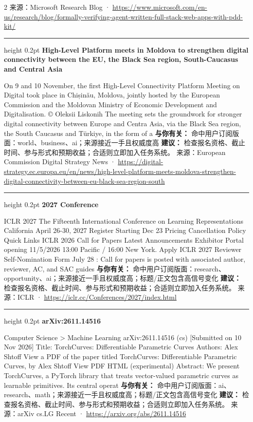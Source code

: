 \documentclass[10.5pt]{ctexart}
\begin{document}
\begin{multicols}{2}
{\footnotesize\color{ormuted} 来源：Microsoft Research Blog · \url{https://www.microsoft.com/en-us/research/blog/formally-verifying-agent-written-full-stack-web-apps-with-pdd-kit/}}
\vspace{2mm}
\hrule height 0.2pt
\vspace{2mm}
{\large\bfseries High-Level Platform meets in Moldova to strengthen digital connectivity between the EU, the Black Sea region, South-Caucasus and Central Asia}\par
On 9 and 10 November, the first High-Level Connectivity Platform Meeting on Digital took place in Chișinău, Moldova, jointly hosted by the European Commission and the Moldovan Ministry of Economic Development and Digitalisation. © Oleksii Liskonih The meeting sets the groundwork for stronger digital connectivity between Europe and Centra Asia, via the Black Sea region, the South Caucasus and Türkiye, in the form of a
\textbf{与你有关：} 命中用户订阅版面：world、business、ai；来源接近一手且权威度高
\textbf{建议：} 检查报名资格、截止时间、参与形式和预期收益；合适则立即加入任务系统。
{\footnotesize\color{ormuted} 来源：European Commission Digital Strategy News · \url{https://digital-strategy.ec.europa.eu/en/news/high-level-platform-meets-moldova-strengthen-digital-connectivity-between-eu-black-sea-region-south}}
\vspace{2mm}
\hrule height 0.2pt
\vspace{2mm}
{\large\bfseries 2027 Conference}\par
ICLR 2027 The Fifteenth International Conference on Learning Representations California April 26-30, 2027 Register Starting Dec 23 Pricing Cancellation Policy Quick Links ICLR 2026 Call for Papers Latest Announcements Exhibitor Portal opening 11/5/2026 13:00 Pacific / 16:00 New York. Apply ICLR 2027 Reviewer Self-Nomination Form July 28 : Call for papers is posted with associated author, reviewer, AC, and SAC guides 
\textbf{与你有关：} 命中用户订阅版面：research、opportunity、ai；来源接近一手且权威度高；标题/正文包含高信号变化
\textbf{建议：} 检查报名资格、截止时间、参与形式和预期收益；合适则立即加入任务系统。
{\footnotesize\color{ormuted} 来源：ICLR · \url{https://iclr.cc/Conferences/2027/index.html}}
\vspace{2mm}
\hrule height 0.2pt
\vspace{2mm}
{\large\bfseries arXiv:2611.14516}\par
Computer Science > Machine Learning arXiv:2611.14516 (cs) [Submitted on 10 Nov 2026] Title: TorchCurves: Differentiable Parametric Curves Authors: Alex Shtoff View a PDF of the paper titled TorchCurves: Differentiable Parametric Curves, by Alex Shtoff View PDF HTML (experimental) Abstract: We present TorchCurves, a PyTorch library that treats vector-valued parametric curves as learnable primitives. Its central operat
\textbf{与你有关：} 命中用户订阅版面：ai、research、math；来源接近一手且权威度高；标题/正文包含高信号变化
\textbf{建议：} 检查报名资格、截止时间、参与形式和预期收益；合适则立即加入任务系统。
{\footnotesize\color{ormuted} 来源：arXiv cs.LG Recent · \url{https://arxiv.org/abs/2611.14516}}
\end{multicols}
\end{document}
